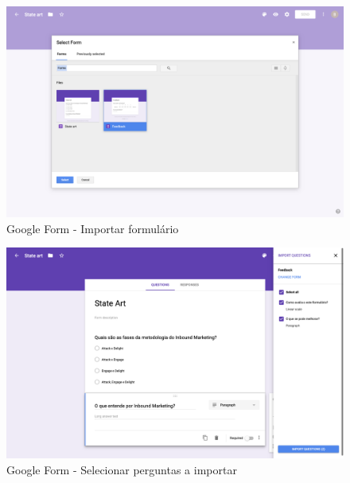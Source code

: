 \begin{figure}[h!]
	\begin{center}
		\includegraphics[width=1\textwidth]{img/gf/gf-form-import}
		\caption{Google Form - Importar formulário}
		\label{fig:gf-form-import}
	\end{center}
\end{figure}

\begin{figure}[h!]
	\begin{center}
		\includegraphics[width=1\textwidth]{img/gf/gf-form-import-select}
		\caption{Google Form - Selecionar perguntas a importar}
		\label{fig:gf-form-import-select}
	\end{center}
\end{figure}

